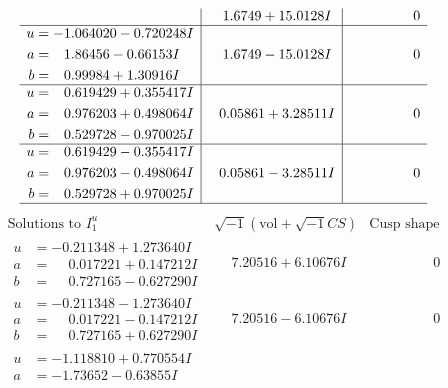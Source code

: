\documentclass[1p]{elsarticle_modified}
\theoremstyle{definition}
\newcommand{\I}{\sqrt{-1}}
\begin{document}
$$\begin{array}{c|c|c}
 & \phantom{-}1.6749 + 15.0128 I & \phantom{-0.000000 } 0 \\ \hline\begin{aligned}
u &= -1.064020 - 0.720248 I \\
a &= \phantom{-}1.86456 - 0.66153 I \\
b &= \phantom{-}0.99984 + 1.30916 I\end{aligned}
 & \phantom{-}1.6749 - 15.0128 I & \phantom{-0.000000 } 0 \\ \hline\begin{aligned}
u &= \phantom{-}0.619429 + 0.355417 I \\
a &= \phantom{-}0.976203 + 0.498064 I \\
b &= \phantom{-}0.529728 - 0.970025 I\end{aligned}
 & \phantom{-}0.05861 + 3.28511 I & \phantom{-0.000000 } 0 \\ \hline\begin{aligned}
u &= \phantom{-}0.619429 - 0.355417 I \\
a &= \phantom{-}0.976203 - 0.498064 I \\
b &= \phantom{-}0.529728 + 0.970025 I\end{aligned}
 & \phantom{-}0.05861 - 3.28511 I & \phantom{-0.000000 } 0\\
 \hline 
 \end{array}$$\newpage$$\begin{array}{c|c|c}  
\text{Solutions to }I^u_{1}& \I (\text{vol} + \sqrt{-1}CS) & \text{Cusp shape}\\
 \hline 
\begin{aligned}
u &= -0.211348 + 1.273640 I \\
a &= \phantom{-}0.017221 + 0.147212 I \\
b &= \phantom{-}0.727165 - 0.627290 I\end{aligned}
 & \phantom{-}7.20516 + 6.10676 I & \phantom{-0.000000 } 0 \\ \hline\begin{aligned}
u &= -0.211348 - 1.273640 I \\
a &= \phantom{-}0.017221 - 0.147212 I \\
b &= \phantom{-}0.727165 + 0.627290 I\end{aligned}
 & \phantom{-}7.20516 - 6.10676 I & \phantom{-0.000000 } 0 \\ \hline\begin{aligned}
u &= -1.118810 + 0.770554 I \\
a &= -1.73652 - 0.63855 I \\

\end{aligned}
\end{array}$$
\end{document}
